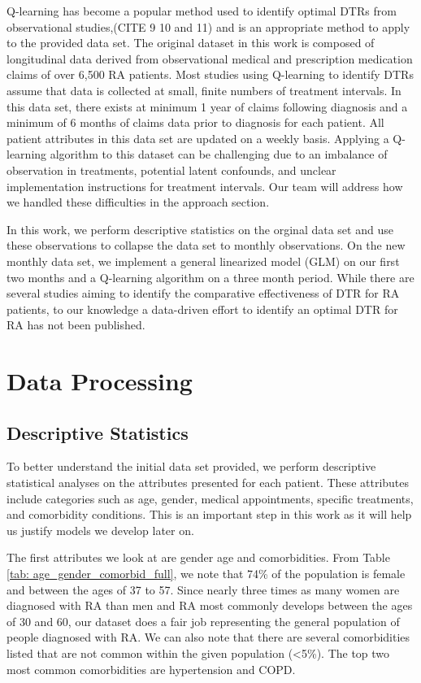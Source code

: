 \documentclass[10pt]{article}
\begin{document}
Q-learning has become a popular method used to identify optimal DTRs from observational studies,(CITE 9 10 and 11) and is an appropriate method to apply to the provided data set. The original dataset in this work is composed of longitudinal data derived from observational medical and prescription medication claims of over 6,500 RA patients. Most studies using Q-learning to identify DTRs assume that data is collected at small, finite numbers of treatment intervals. In this data set, there exists at minimum 1 year of claims following diagnosis and a minimum of 6 months of claims data prior to diagnosis for each patient. All patient attributes in this data set are updated on a weekly basis. Applying a Q-learning algorithm to this dataset can be challenging due to an imbalance of observation in treatments, potential latent confounds, and unclear implementation instructions for treatment intervals. Our team will address how we handled these difficulties in the approach section.

In this work, we perform descriptive statistics on the orginal data set and use these observations to collapse the data set to monthly observations. On the new monthly data set, we implement a general linearized model (GLM) on our first two months and a Q-learning algorithm on a three month period. While there are several studies aiming to identify the comparative effectiveness of DTR for RA patients, to our knowledge a data-driven effort to identify an optimal DTR for RA has not been published.  

\section{Data Processing}

\subsection{Descriptive Statistics}
To better understand the initial data set provided, we perform descriptive statistical analyses on the attributes presented for each patient. These attributes include categories such as age, gender, medical appointments, specific treatments, and comorbidity conditions. This is an important step in this work as it will help us justify models we develop later on. 

The first attributes we look at are gender age and comorbidities. From Table \ref{tab: age_gender_comorbid_full}, we note that 74\% of the population is female and between the ages of 37 to 57. Since nearly three times as many women are diagnosed with RA than men and RA most commonly develops between the ages of 30 and 60, our dataset does a fair job representing the general population of people diagnosed with RA. We can also note that there are several comorbidities listed that are not common within the given population (<5\%).  The top two most common comorbidities are hypertension and COPD. 
\end{document}
